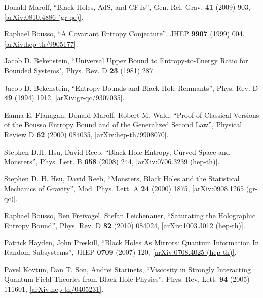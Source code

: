 \documentclass[12pt]{article}
\newcommand{\2}{$^2$}
\newcommand{\3}{$^3$}
\newcommand{\4}{$_4$}
\newcommand{\5}{$_5$}
\newcommand{\x}{arXiv:}
\begin{document}
\begin{thebibliography}{400}
Donald Marolf, ``Black Holes, AdS, and CFTs'', Gen. Rel. Grav. \textbf{41} (2009) 903, \href{http://arxiv.org/abs/0810.4886}{[arXiv:0810.4886 (gr-qc)]}.


Raphael Bousso, ``A Covariant Entropy Conjecture'', JHEP \textbf{9907} (1999) 004, \href{http://arxiv.org/abs/hep-th/9905177}{[arXiv:hep-th/9905177]}. 

Jacob D. Bekenstein, ``Universal Upper Bound to Entropy-to-Energy Ratio for Bounded Systems", Phys. Rev. D \textbf{23} (1981) 287.

Jacob D. Bekenstein, ``Entropy Bounds and Black Hole Remnants'', Phys. Rev. D \textbf{49} (1994) 1912, \href{http://arxiv.org/abs/gr-qc/9307035v1}{[arXiv:gr-qc/9307035]}.

Eanna E. Flanagan, Donald Marolf, Robert M. Wald, ``Proof of Classical Versions of the Bousso
Entropy Bound and of the Generalized Second Law'', Physical Review D \textbf{62} (2000) 084035,
\href{http://xxx.lanl.gov/abs/hep-th/9908070}{[arXiv:hep-th/9908070]}.

Stephen D.H. Hsu, David Reeb, ``Black Hole Entropy, Curved Space and Monsters'', 	Phys. Lett. B \textbf{658} (2008) 244, \href{http://arxiv.org/abs/0706.3239}{[arXiv:0706.3239 (hep-th)]}.

Stephen D. H. Hsu, David Reeb, ``Monsters, Black Holes and the Statistical Mechanics of Gravity'', Mod. Phys. Lett. A \textbf{24} (2000) 1875, \href{http://arxiv.org/abs/0908.1265}{[arXiv:0908.1265 (gr-qc)]}.


Raphael Bousso, Ben Freivogel, Stefan Leichenauer, ``Saturating the Holographic Entropy Bound'', 	Phys. Rev. D \textbf{82} (2010) 084024, \href{http://arxiv.org/abs/1003.3012}{[arXiv:1003.3012 (hep-th)]}. 

Patrick Hayden, John Preskill, ``Black Holes As Mirrors: Quantum Information In Random Subsystems'', JHEP \textbf{0709} (2007) 120, \href{http://arxiv.org/abs/0708.4025}{[arXiv:0708.4025 (hep-th)]}.

Pavel Kovtun, Dan T. Son, Andrei Starinets, ``Viscosity in Strongly Interacting Quantum Field Theories from Black Hole Physics'',
Phys. Rev. Lett. \textbf{94} (2005) 111601, \href{http://arxiv.org/abs/hep-th/0405231}{[\x hep-th/0405231]}.


\end{thebibliography}
\end{document}
